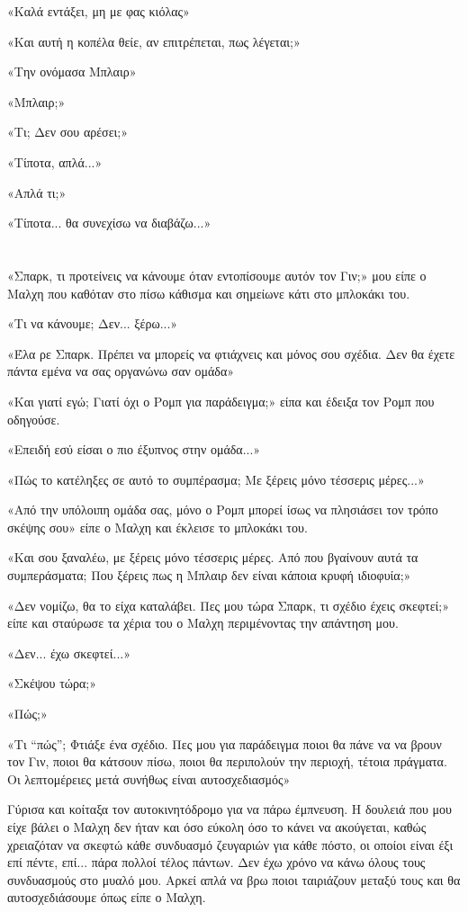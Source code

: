 \documentclass[12pt,twoside, openany]{book}
\begin{document}
«Καλά εντάξει, μη με φας κιόλας»

«Και αυτή η κοπέλα θείε, αν επιτρέπεται, πως λέγεται;»

«Την ονόμασα Μπλαιρ»

«Μπλαιρ;»

«Tι; Δεν σου αρέσει;»

«Τίποτα, απλά...»

«Απλά τι;»

«Τίποτα... θα συνεχίσω να διαβάζω...»

\chapter{}

«Σπαρκ, τι προτείνεις να κάνουμε όταν εντοπίσουμε αυτόν τον Γιν;» μου είπε ο Μαλχη που καθόταν στο πίσω κάθισμα και σημείωνε κάτι στο μπλοκάκι του.

«Τι να κάνουμε; Δεν... ξέρω...»

«Έλα ρε Σπαρκ. Πρέπει να μπορείς να φτιάχνεις και μόνος σου σχέδια. Δεν θα έχετε πάντα εμένα να σας οργανώνω σαν ομάδα»

«Και γιατί εγώ; Γιατί όχι ο Ρομπ για παράδειγμα;» είπα και έδειξα τον Ρομπ που οδηγούσε.

«Επειδή εσύ είσαι ο πιο έξυπνος στην ομάδα...»

«Πώς το κατέληξες σε αυτό το συμπέρασμα; Με ξέρεις μόνο τέσσερις μέρες...»

«Από την υπόλοιπη ομάδα σας, μόνο ο Ρομπ μπορεί ίσως να πλησιάσει τον τρόπο σκέψης σου» είπε ο Μαλχη και έκλεισε το μπλοκάκι του.

«Και σου ξαναλέω, με ξέρεις μόνο τέσσερις μέρες. Από που βγαίνουν αυτά τα συμπεράσματα; Που ξέρεις πως η Μπλαιρ δεν είναι κάποια κρυφή ιδιοφυία;»

«Δεν νομίζω, θα το είχα καταλάβει. Πες μου τώρα Σπαρκ, τι σχέδιο έχεις σκεφτεί;» είπε και σταύρωσε τα χέρια του ο Μαλχη περιμένοντας την απάντηση μου.

«Δεν... έχω σκεφτεί...»

«Σκέψου τώρα;»

«Πώς;»

«Τι “πώς”; Φτιάξε ένα σχέδιο. Πες μου για παράδειγμα ποιοι θα πάνε να να βρουν τον Γιν, ποιοι θα κάτσουν πίσω, ποιοι θα περιπολούν την περιοχή, τέτοια πράγματα. Οι λεπτομέρειες μετά συνήθως είναι αυτοσχεδιασμός»

Γύρισα και κοίταξα τον αυτοκινητόδρομο για να πάρω έμπνευση. Η δουλειά που μου είχε βάλει ο Μαλχη δεν ήταν και όσο εύκολη όσο το κάνει να ακούγεται, καθώς χρειαζόταν να σκεφτώ κάθε συνδυασμό ζευγαριών για κάθε πόστο, οι οποίοι είναι έξι επί πέντε, επί... πάρα πολλοί τέλος πάντων. Δεν έχω χρόνο να κάνω όλους τους συνδυασμούς στο μυαλό μου. Αρκεί απλά να βρω ποιοι ταιριάζουν μεταξύ τους και θα αυτοσχεδιάσουμε όπως είπε ο Μαλχη.
\end{document}
